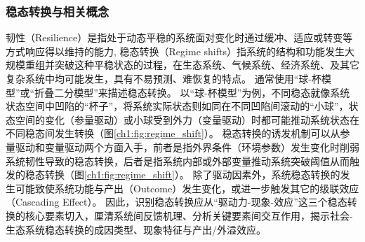 
\subsubsection*{稳态转换与相关概念}

韧性（Resilience）是指处于动态平稳的系统面对变化时通过缓冲、适应或转变等方式响应得以维持的能力\cite{folke2010}, 稳态转换（Regime shifts）指系统的结构和功能发生大规模重组并突破这种平稳状态的过程\cite{scheffer2001}，在生态系统、气候系统、经济系统、及其它复杂系统中均可能发生，具有不易预测、难恢复的特点\cite{scheffer2003, biggs2009}。
通常使用“球-杯模型”或“折叠二分模型”来描述稳态转换。
以“球-杯模型”为例，不同稳态就像系统状态空间中凹陷的“杯子”，将系统实际状态则如同在不同凹陷间滚动的“小球”，状态空间的变化（参量驱动）或小球受到外力（变量驱动）时都可能推动系统状态在不同稳态间发生转换\cite{scheffer2009, folke2010}（图\ref{ch1:fig:regime_shift}）。
稳态转换的诱发机制可以从参量驱动和变量驱动两个方面入手，前者是指外界条件（环境参数）发生变化时削弱系统韧性导致的稳态转换，后者是指系统内部或外部变量推动系统突破阈值从而触发的稳态转换\cite{scheffer2009, folke2010}（图\ref{ch1:fig:regime_shift}）。
除了驱动因素外，系统稳态转换的发生可能致使系统功能与产出（Outcome）发生变化，或进一步触发其它的级联效应（Cascading Effect）\cite{rocha2018}。
因此，识别稳态转换应从“驱动力-现象-效应”这三个稳态转换的核心要素切入，厘清系统间反馈机理、分析关键要素间交互作用，揭示社会-生态系统稳态转换的成因类型、现象特征与产出/外溢效应。

